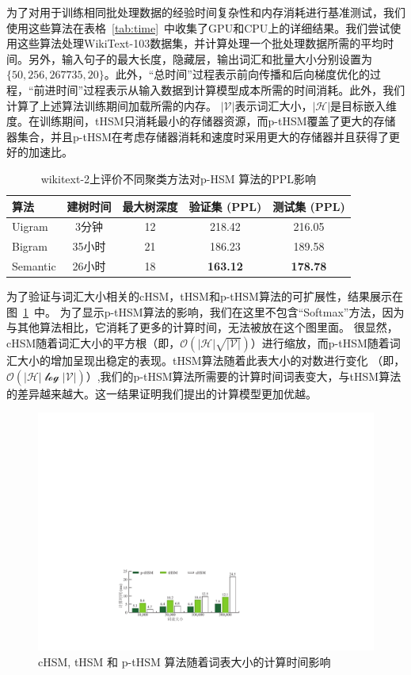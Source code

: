 为了对用于训练相同批处理数据的经验时间复杂性和内存消耗进行基准测试，我们使用这些算法在表格~\ref{tab:time}~中收集了GPU和CPU上的详细结果。我们尝试使用这些算法处理WikiText-103数据集，并计算处理一个批处理数据所需的平均时间。另外，输入句子的最大长度，隐藏层，输出词汇和批量大小分别设置为$\{50, 256, 267735, 20\}$。此外，“总时间”过程表示前向传播和后向梯度优化的过程，“前进时间”过程表示从输入数据到计算模型成本所需的时间消耗。此外，我们计算了上述算法训练期间加载所需的内存。 $ \mathcal{| V |} $表示词汇大小，$ \mathcal{| H |} $是目标嵌入维度。在训练期间，tHSM只消耗最小的存储器资源，而p-tHSM覆盖了更大的存储器集合，并且p-tHSM在考虑存储器消耗和速度时采用更大的存储器并且获得了更好的加速比。

\begin{table}[!ht]
  \centering
   \caption{wikitext-2上评价不同聚类方法对p-HSM 算法的PPL影响\label{table:p-thsm}}
  \begin{tabular}{lcccc} \toprule
  算法  &建树时间&最大树深度 &验证集 (PPL) & 测试集 (PPL)  \\ \midrule
  Uigram  &3分钟&12 &218.42& 216.05     \\
  Bigram  &35小时&21& 186.23& 189.58\\
  Semantic &26小时 &18& \textbf{163.12} & \textbf{178.78}\\
\bottomrule
  \end{tabular}
\end{table}

为了验证与词汇大小相关的cHSM，tHSM和p-tHSM算法的可扩展性，结果展示在图~\ref{fig:hsm_benchmark}~中。 为了显示p-tHSM算法的影响，我们在这里不包含“Softmax”方法，因为与其他算法相比，它消耗了更多的计算时间，无法被放在这个图里面。 很显然，cHSM随着词汇大小的平方根（即，$ \mathcal{O(| H | \sqrt{| V |})} $）进行缩放，而p-tHSM随着词汇大小的增加呈现出稳定的表现。tHSM算法随着此表大小的对数进行变化 （即，$ \mathcal{O(| H | \log{| V |})} $）,我们的p-tHSM算法所需要的计算时间词表变大，与tHSM算法的差异越来越大。这一结果证明我们提出的计算模型更加优越。
\begin{figure}[!ht]
  \centering
  \includegraphics[width=0.8\columnwidth]{./figures/all_time.pdf}
  \caption{cHSM, tHSM 和 p-tHSM 算法随着词表大小的计算时间影响}\label{fig:hsm_benchmark}
\end{figure}

